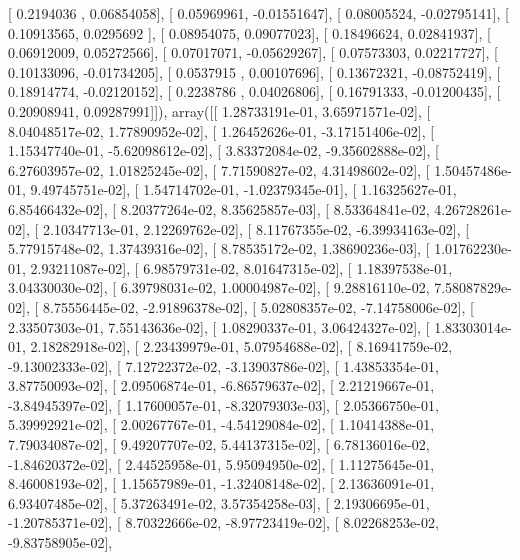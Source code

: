 \documentclass{article}
\begin{document}
       [ 0.2194036 ,  0.06854058],
       [ 0.05969961, -0.01551647],
       [ 0.08005524, -0.02795141],
       [ 0.10913565,  0.0295692 ],
       [ 0.08954075,  0.09077023],
       [ 0.18496624,  0.02841937],
       [ 0.06912009,  0.05272566],
       [ 0.07017071, -0.05629267],
       [ 0.07573303,  0.02217727],
       [ 0.10133096, -0.01734205],
       [ 0.0537915 ,  0.00107696],
       [ 0.13672321, -0.08752419],
       [ 0.18914774, -0.02120152],
       [ 0.2238786 ,  0.04026806],
       [ 0.16791333, -0.01200435],
       [ 0.20908941,  0.09287991]]), array([[  1.28733191e-01,   3.65971571e-02],
       [  8.04048517e-02,   1.77890952e-02],
       [  1.26452626e-01,  -3.17151406e-02],
       [  1.15347740e-01,  -5.62098612e-02],
       [  3.83372084e-02,  -9.35602888e-02],
       [  6.27603957e-02,   1.01825245e-02],
       [  7.71590827e-02,   4.31498602e-02],
       [  1.50457486e-01,   9.49745751e-02],
       [  1.54714702e-01,  -1.02379345e-01],
       [  1.16325627e-01,   6.85466432e-02],
       [  8.20377264e-02,   8.35625857e-03],
       [  8.53364841e-02,   4.26728261e-02],
       [  2.10347713e-01,   2.12269762e-02],
       [  8.11767355e-02,  -6.39934163e-02],
       [  5.77915748e-02,   1.37439316e-02],
       [  8.78535172e-02,   1.38690236e-03],
       [  1.01762230e-01,   2.93211087e-02],
       [  6.98579731e-02,   8.01647315e-02],
       [  1.18397538e-01,   3.04330030e-02],
       [  6.39798031e-02,   1.00004987e-02],
       [  9.28816110e-02,   7.58087829e-02],
       [  8.75556445e-02,  -2.91896378e-02],
       [  5.02808357e-02,  -7.14758006e-02],
       [  2.33507303e-01,   7.55143636e-02],
       [  1.08290337e-01,   3.06424327e-02],
       [  1.83303014e-01,   2.18282918e-02],
       [  2.23439979e-01,   5.07954688e-02],
       [  8.16941759e-02,  -9.13002333e-02],
       [  7.12722372e-02,  -3.13903786e-02],
       [  1.43853354e-01,   3.87750093e-02],
       [  2.09506874e-01,  -6.86579637e-02],
       [  2.21219667e-01,  -3.84945397e-02],
       [  1.17600057e-01,  -8.32079303e-03],
       [  2.05366750e-01,   5.39992921e-02],
       [  2.00267767e-01,  -4.54129084e-02],
       [  1.10414388e-01,   7.79034087e-02],
       [  9.49207707e-02,   5.44137315e-02],
       [  6.78136016e-02,  -1.84620372e-02],
       [  2.44525958e-01,   5.95094950e-02],
       [  1.11275645e-01,   8.46008193e-02],
       [  1.15657989e-01,  -1.32408148e-02],
       [  2.13636091e-01,   6.93407485e-02],
       [  5.37263491e-02,   3.57354258e-03],
       [  2.19306695e-01,  -1.20785371e-02],
       [  8.70322666e-02,  -8.97723419e-02],
       [  8.02268253e-02,  -9.83758905e-02],
\end{document}
